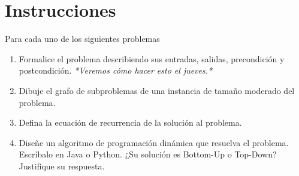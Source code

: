 \section*{Instrucciones}
Para cada uno de los siguientes problemas
\begin{enumerate}
	\item Formalice el problema describiendo sus entradas, salidas, precondición y postcondición.
		{\small \emph{*Veremos cómo hacer esto el jueves.*}}
	\item Dibuje el grafo de subproblemas de una instancia de tamaño moderado del problema.
	\item Defina la ecuación de recurrencia de la solución al problema.
	\item Diseñe un algoritmo de programación dinámica que resuelva el problema.
		Escríbalo en Java o Python. ¿Su solución es Bottom-Up o Top-Down? Justifique
		su respuesta.
\end{enumerate}
